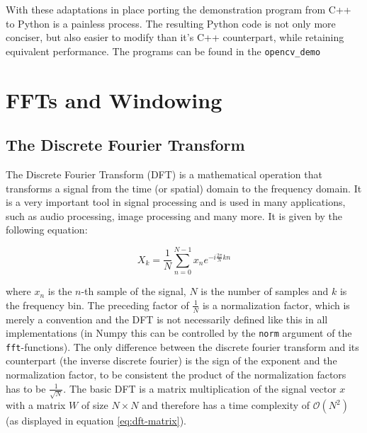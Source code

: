 \documentclass[english,11pt,a4paper,table]{article} %
\let\stdsection\section %
\renewcommand\section{\clearpage\newpage\stdsection} %
\begin{document}
With these adaptations in place porting the demonstration program from C++ to Python is a painless process.
The resulting Python code is not only more conciser, but also easier to modify than it's C++ counterpart, while retaining equivalent performance. The programs can be found in the \texttt{opencv\_demo}

\section{FFTs and Windowing}
\label{fft-introduction}

\subsection{The Discrete Fourier Transform}

The Discrete Fourier Transform (DFT) is a mathematical operation that transforms a signal from the time (or spatial) domain to the frequency domain.
It is a very important tool in signal processing and is used in many applications, such as audio processing, image processing and many more.
It is given by the following equation:

\begin{equation}
\label{eq:dft}
X_k = \frac{1}{N} \sum_{n=0}^{N-1} x_n e^{-i \frac{2 \pi}{N} k n}
\end{equation}


where $x_n$ is the $n$-th sample of the signal, $N$ is the number of samples and $k$ is the frequency bin.
The preceding factor of $\frac{1}{N}$ is a normalization factor, which is merely a convention and the DFT is not necessarily defined like this in all implementations (in Numpy this can be controlled by the \texttt{norm} argument of the \texttt{fft}-functions).
The only difference between the discrete fourier transform and its counterpart (the inverse discrete fourier) is the sign of the exponent and the normalization factor, to be consistent the product of the normalization factors has to be $\frac{1}{\sqrt{N}}$.
The basic DFT is a matrix multiplication of the signal vector $x$ with a matrix $W$ of size $N \times N$ and therefore has a time complexity of $\mathcal{O}(N^2)$ (as displayed in equation \ref{eq:dft-matrix}).
\end{document}
